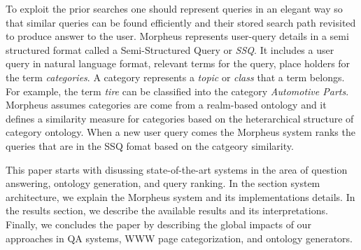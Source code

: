 To exploit the prior searches one should represent queries in an elegant way so
that similar queries can be found efficiently and their stored search path
revisited to produce answer to the user. Morpheus represents user-query details in a semi structured format called a Semi-Structured Query or \textit{SSQ}. It includes a user query in natural language format, relevant terms for the query, place holders for the term \textit{categories}. A category represents a \textit{topic} or \textit{class} that a term belongs. For example, the term \textit{tire} can be classified into the category \textit{Automotive Parts}. Morpheus assumes categories are come from a realm-based ontology and it defines  a similarity measure for categories based on the heterarchical structure of  category ontology. When a new user query comes the Morpheus system ranks the queries that are in the SSQ fomat based on the catgeory similarity. 


This paper starts with disussing state-of-the-art systems in the area of question answering, ontology generation, and query ranking. In the section system architecture, we explain the Morpheus system and its implementations details. In the results section, we describe the available results and its interpretations. Finally, we concludes the paper by describing the global impacts of our approaches in QA systems, WWW page categorization, and ontology generators.   
